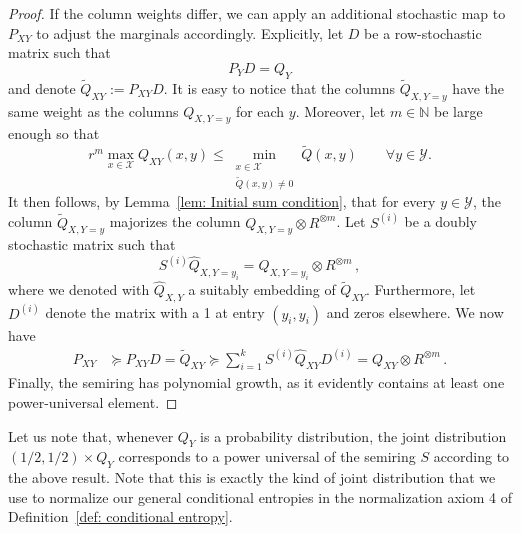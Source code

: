 \documentclass[aps,pra,11pt,onecolumn,nofootinbib,tightenlines]{revtex4-2}
\theoremstyle{definition}
\newcommand{\mc}[1]{\mathcal{#1}}
\newcommand{\mb}[1]{\mathbb{#1}}
\begin{document}
\begin{proof}
If the column weights differ, we can apply an additional stochastic map to $P_{XY}$ to adjust the marginals accordingly. Explicitly, let $D$ be a row-stochastic matrix such that
\begin{equation}
    P_{Y}D=Q_Y
\end{equation}
and denote $\widetilde{Q}_{XY}:=P_{XY}D$. It is easy to notice that the columns $\widetilde{Q}_{X,Y=y}$ have the same weight as the columns $Q_{X,Y=y}$ for each $y$.
Moreover,  let $m\in\mb N$ be large enough so that
\begin{equation}
r^m\max_{x \in\mc X}Q_{XY}(x,y)\leq \min_{\substack{x \in\mc X \\ \widetilde{Q}(x, y) \neq 0}} \widetilde{Q}(x, y) \qquad\forall y\in\mc Y.
\end{equation}
It then follows, by Lemma~\ref{lem: Initial sum condition}, that for every $y \in\mc Y$, the column $\widetilde{Q}_{X,Y=y}$ majorizes the column $Q_{X,Y=y} \otimes R^{\otimes m}$.
Let $S^{(i)}$ be a doubly stochastic matrix such that
\begin{equation}
    S^{(i)} \widehat{Q}_{X,Y=y_i} = Q_{X,Y=y_i} \otimes R^{\otimes m} \,,
\end{equation}
where we denoted with $\widehat{Q}_{X,Y}$ a suitably embedding of $\widetilde{Q}_{XY}$.
Furthermore, let $D^{(i)}$ denote the matrix with a 1 at entry $(y_i, y_i)$ and zeros elsewhere.
We now have
\begin{align}
P_{XY}&\succeq P_{XY}D=\widetilde{Q}_{XY}\succeq\sum_{i=1}^kS^{(i)}\widehat{Q}_{XY}D^{(i)} =  Q_{XY}\otimes R^{\otimes m}\,.
\end{align}
Finally, the semiring has polynomial growth, as it evidently contains at least one power-universal element.

\end{proof}
Let us note that, whenever $Q_Y$ is a probability distribution, the joint distribution $(1/2,1/2)\times Q_Y$ corresponds to a power universal of the semiring $S$ according to the above result. Note that this is exactly the kind of joint distribution that we use to normalize our general conditional entropies in the normalization axiom 4 of Definition~\ref{def: conditional entropy}.
\end{document}
